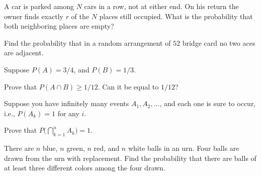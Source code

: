 \begin{problem}[Handout 2, \# 15]
  A car is parked among \(N\) cars in a row, not at either end. On his
  return the owner finds exactly \(r\) of the \(N\) places still
  occupied. What is the probability that both neighboring places are empty?
\end{problem}
\begin{solution*}
\end{solution*}

\begin{problem}[Handout 2, \# 16]
  Find the probability that in a random arrangement of \(52\) bridge card
  no two aces are adjacent.
\end{problem}
\begin{solution*}
\end{solution*}

\begin{problem}[Handout 2, \# 17]
  Suppose \(P(A)=3/4\), and \(P(B)=1/3\).

  \noindent Prove that \(P(A\cap B)\geq 1/12\). Can it be equal to
  \(1/12\)?
\end{problem}
\begin{solution*}
\end{solution*}

\begin{problem}[Handout 2, \# 18]
  Suppose you have infinitely many events \(A_1,A_2,\dotsc\), and each one
  is sure to occur, i.e., \(P(A_k)=1\) for any \(i\).

  \noindent Prove that \(P\bigl(\bigcap_{k=1}^n A_k\bigr)=1\).
\end{problem}
\begin{solution*}
\end{solution*}

\begin{problem}[Handout 2, \# 19]
  There are \(n\) blue, \(n\) green, \(n\) red, and \(n\) white balls in an
  urn. Four balls are drawn from the urn with replacement. Find the
  probability that there are balls of at least three different colors among
  the four drawn.
\end{problem}
\begin{solution*}
\end{solution*}

